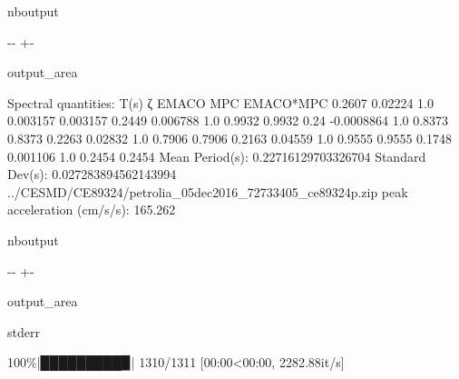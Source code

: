 \documentclass[letterpaper,10pt,english]{sphinxmanual}
\begin{document}
\begin{sphinxuseclass}{nboutput}
{

\kern-\sphinxverbatimsmallskipamount\kern-\baselineskip
\kern+\FrameHeightAdjust\kern-\fboxrule
\vspace{\nbsphinxcodecellspacing}

\begin{sphinxuseclass}{output_area}
\begin{sphinxuseclass}{}


\begin{sphinxVerbatim}[commandchars=\\\{\}]
Spectral quantities:
       T(s)        ζ        EMACO        MPC     EMACO*MPC
      0.2607     0.02224    1.0        0.003157   0.003157
      0.2449     0.006788   1.0        0.9932     0.9932
      0.24       -0.0008864  1.0        0.8373     0.8373
      0.2263     0.02832    1.0        0.7906     0.7906
      0.2163     0.04559    1.0        0.9555     0.9555
      0.1748     0.001106   1.0        0.2454     0.2454
Mean Period(s): 0.22716129703326704
Standard Dev(s): 0.027283894562143994
../CESMD/CE89324/petrolia\_05dec2016\_72733405\_ce89324p.zip
peak acceleration (cm/s/s): 165.262
\end{sphinxVerbatim}



\end{sphinxuseclass}
\end{sphinxuseclass}
}

\end{sphinxuseclass}
\begin{sphinxuseclass}{nboutput}
{

\kern-\sphinxverbatimsmallskipamount\kern-\baselineskip
\kern+\FrameHeightAdjust\kern-\fboxrule
\vspace{\nbsphinxcodecellspacing}

\begin{sphinxuseclass}{output_area}
\begin{sphinxuseclass}{stderr}


\begin{sphinxVerbatim}[commandchars=\\\{\}]
100\%|█████████▉| 1310/1311 [00:00<00:00, 2282.88it/s]
\end{sphinxVerbatim}



\end{sphinxuseclass}
\end{sphinxuseclass}
}

\end{sphinxuseclass}
\end{document}
